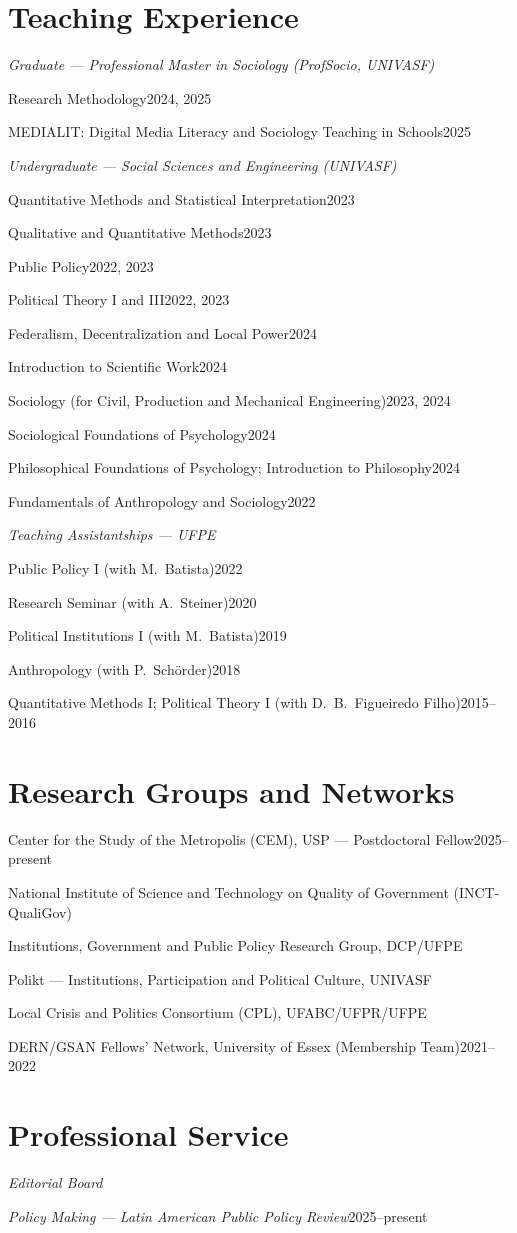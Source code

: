 \documentclass[11pt]{article}
\newcommand{\cvsubsection}[1]{\vspace{0.3em}\textit{#1}\par\vspace{0.1em}}
\newcommand{\entryplain}[2]{\noindent#1\hfill #2\par}
\begin{document}
\section{Teaching Experience}
\cvsubsection{Graduate --- Professional Master in Sociology (ProfSocio, UNIVASF)}
\entryplain{Research Methodology}{2024, 2025}
\entryplain{MEDIALIT: Digital Media Literacy and Sociology Teaching in Schools}{2025}

\cvsubsection{Undergraduate --- Social Sciences and Engineering (UNIVASF)}
\entryplain{Quantitative Methods and Statistical Interpretation}{2023}
\entryplain{Qualitative and Quantitative Methods}{2023}
\entryplain{Public Policy}{2022, 2023}
\entryplain{Political Theory I and III}{2022, 2023}
\entryplain{Federalism, Decentralization and Local Power}{2024}
\entryplain{Introduction to Scientific Work}{2024}
\entryplain{Sociology (for Civil, Production and Mechanical Engineering)}{2023, 2024}
\entryplain{Sociological Foundations of Psychology}{2024}
\entryplain{Philosophical Foundations of Psychology; Introduction to Philosophy}{2024}
\entryplain{Fundamentals of Anthropology and Sociology}{2022}

\cvsubsection{Teaching Assistantships --- UFPE}
\entryplain{Public Policy I (with M.\ Batista)}{2022}
\entryplain{Research Seminar (with A.\ Steiner)}{2020}
\entryplain{Political Institutions I (with M.\ Batista)}{2019}
\entryplain{Anthropology (with P.\ Schörder)}{2018}
\entryplain{Quantitative Methods I; Political Theory I (with D.\ B.\ Figueiredo Filho)}{2015--2016}

\section{Research Groups and Networks}

\entryplain{Center for the Study of the Metropolis (CEM), USP --- Postdoctoral Fellow}{2025--present}
\entryplain{National Institute of Science and Technology on Quality of Government (INCT-QualiGov)}{}
\entryplain{Institutions, Government and Public Policy Research Group, DCP/UFPE}{}
\entryplain{Polikt --- Institutions, Participation and Political Culture, UNIVASF}{}
\entryplain{Local Crisis and Politics Consortium (CPL), UFABC/UFPR/UFPE}{}
\entryplain{DERN/GSAN Fellows' Network, University of Essex (Membership Team)}{2021--2022}

\section{Professional Service}
\cvsubsection{Editorial Board}
\entryplain{\textit{Policy Making --- Latin American Public Policy Review}}{2025--present}
\end{document}
